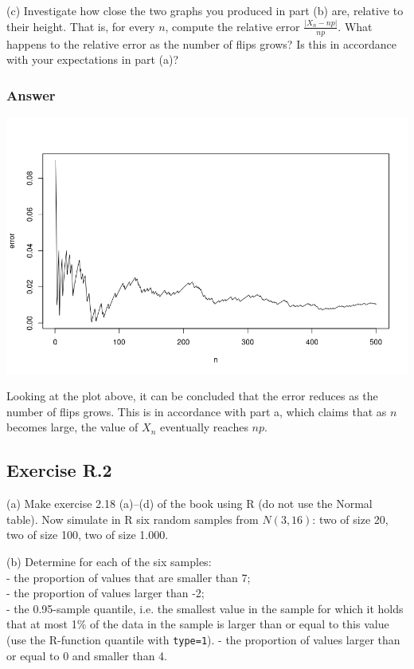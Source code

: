 \documentclass[12pt]{article}
\begin{document}
(c) Investigate how close the two graphs you produced in part (b) are, relative to their height. That is, for every $n$, compute the relative error
$\frac{|X_{n} - np|}{np}$. What happens to the relative error as the number of flips grows? Is this in accordance with your expectations in part (a)?
\subsubsection*{Answer}
\includegraphics[width=\textwidth]{Ex1Plot2}

Looking at the plot above, it can be concluded that the error reduces as the number of flips grows. This is in accordance with part a, which claims that as $n$ becomes large, the value of $X_{n}$ eventually reaches $np$.

\subsection*{Exercise R.2}
(a) Make exercise 2.18 (a)–(d) of the book using R (do not use the Normal table). Now simulate in R six random samples from $N(3, 16)$: two of size 20, two of size 100, two of size 1.000.

(b) Determine for each of the six samples:\\
- the proportion of values that are smaller than 7;\\
- the proportion of values larger than -2;\\
- the 0.95-sample quantile, i.e. the smallest value in the sample for which it holds that at most 1\% of the data in the sample is larger than or equal to this value (use the R-function quantile with \texttt{type=1}).
- the proportion of values larger than or equal to 0 and smaller than 4.
\end{document}
